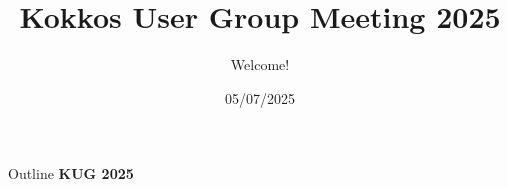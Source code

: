 
\usepackage{tikz}
\graphicspath{{figures/}}
\usepackage{multicol}
\usepackage{pgfplots}

\def\ornlid{THIS WILL NEED TO BE UPDATED AFTER RESOLUTION}

\title{Kokkos User Group Meeting 2025}

\author{Welcome!}

\date{05/07/2025}

\AtBeginSection[]{
  \begin{frame}
  \vfill
  \centering
  \textbf{\huge{\insertsectionhead}}
  \vfill
  \end{frame}
}
\AtBeginSubsection[]{
  \begin{frame}
  \vfill
  \centering
  \textbf{\huge{\insertsectionhead}} \\
  \vspace{1cm}
  \insertsubsectionhead
  \vfill 
  \end{frame}
}





\begin{frame}
  \titlepage
\end{frame}

\begin{frame}[fragile]{Outline}
\textbf{KUG 2025}
\tableofcontents
\end{frame}







